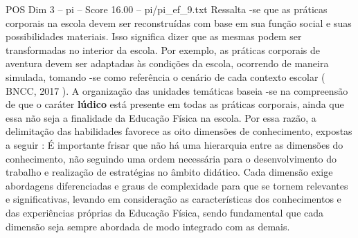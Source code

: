 \begin{textsample}{POS Dim 3 – pi – Score 16.00 – pi/pi\_ef\_9.txt}
Ressalta -se que as práticas corporais na escola devem ser reconstruídas com base em sua função social e suas possibilidades materiais.
Isso significa dizer que as mesmas podem ser transformadas no interior da escola.
Por exemplo, as práticas corporais de aventura devem ser adaptadas às condições da escola, ocorrendo de maneira simulada, tomando -se como referência o cenário de cada contexto escolar ( BNCC, 2017 ).
A organização das unidades temáticas baseia -se na compreensão de que o caráter \textbf{lúdico} está presente em todas as práticas corporais, ainda que essa não seja a finalidade da Educação Física na escola.
Por essa razão, a delimitação das habilidades favorece as oito dimensões de conhecimento, expostas a seguir : É importante frisar que não há uma hierarquia entre as dimensões do conhecimento, não seguindo uma ordem necessária para o desenvolvimento do trabalho e realização de estratégias no âmbito didático.
Cada dimensão exige abordagens diferenciadas e graus de complexidade para que se tornem relevantes e significativas, levando em consideração as características dos conhecimentos e das experiências próprias da Educação Física, sendo fundamental que cada dimensão seja sempre abordada de modo integrado com as demais.

\end{textsample}
